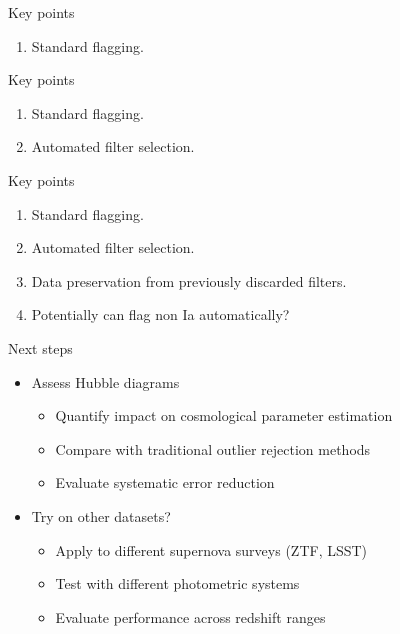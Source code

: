 \documentclass[aspectratio=169]{beamer}
\begin{document}
\begin{frame}{Key points}
  \begin{enumerate}
    \item Standard flagging.
  \end{enumerate}
\end{frame}

\begin{frame}{Key points}
  \begin{enumerate}
    \item Standard flagging.
    \item Automated filter selection.
  \end{enumerate}
\end{frame}

\begin{frame}{Key points}
  \begin{enumerate}
    \item Standard flagging.
    \item Automated filter selection.
    \item Data preservation from previously discarded filters.
    \item Potentially can flag non Ia automatically?
  \end{enumerate}
\end{frame}

\begin{frame}{Next steps}
  \begin{itemize}
    \item Assess Hubble diagrams 
      \begin{itemize}
        \item Quantify impact on cosmological parameter estimation
        \item Compare with traditional outlier rejection methods
        \item Evaluate systematic error reduction
      \end{itemize}
    \item Try on other datasets?
      \begin{itemize}
        \item Apply to different supernova surveys (ZTF, LSST)
        \item Test with different photometric systems
        \item Evaluate performance across redshift ranges
      \end{itemize}
  \end{itemize}
\end{frame}
\end{document}

